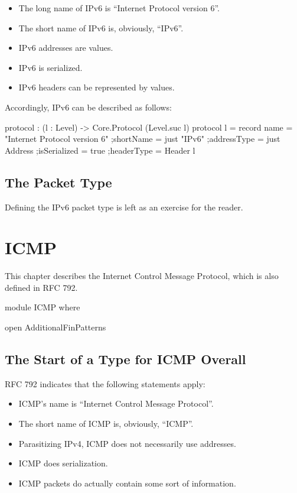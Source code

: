 \documentclass{report}
\begin{document}
\begin{itemize}
\begin{itemize}
  \item The long name of IPv6 is ``Internet Protocol version 6''.
  \item The short name of IPv6 is, obviously, ``IPv6''.
  \item IPv6 addresses are  values.
  \item IPv6 is serialized.
  \item IPv6 headers can be represented by  values.
\end{itemize}

Accordingly, IPv6 can be described as follows:

\begin{code}
  protocol : (l : Level) -> Core.Protocol (Level.suc l)
  protocol l = record
    {name = "Internet Protocol version 6"
    ;shortName = just "IPv6"
    ;addressType = just Address
    ;isSerialized = true
    ;headerType = Header l
    }
\end{code}

\section{The Packet Type}
Defining the IPv6 packet type is left as an exercise for the reader.

\chapter{ICMP}
This chapter describes the Internet Control Message Protocol, which is also defined in RFC 792.

\begin{code}
module ICMP where

  open AdditionalFinPatterns
\end{code}

\section{The Start of a Type for ICMP Overall}
RFC 792 indicates that the following statements apply:

\begin{itemize}
  \item ICMP's name is ``Internet Control Message Protocol''.
  \item The short name of ICMP is, obviously, ``ICMP''.
  \item Parasitizing IPv4, ICMP does not necessarily use addresses.
  \item ICMP does serialization.
  \item ICMP packets do actually contain some sort of information.
\end{itemize}


\end{itemize}
\end{document}
